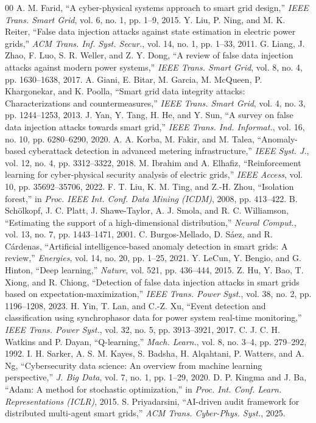 \documentclass[conference]{IEEEtran}
\begin{document}
\begin{thebibliography}{00}
 A. M. Farid, ``A cyber-physical systems approach to smart grid design,'' \textit{IEEE Trans. Smart Grid}, vol. 6, no. 1, pp. 1--9, 2015.
 Y. Liu, P. Ning, and M. K. Reiter, ``False data injection attacks against state estimation in electric power grids,'' \textit{ACM Trans. Inf. Syst. Secur.}, vol. 14, no. 1, pp. 1--33, 2011.
 G. Liang, J. Zhao, F. Luo, S. R. Weller, and Z. Y. Dong, ``A review of false data injection attacks against modern power systems,'' \textit{IEEE Trans. Smart Grid}, vol. 8, no. 4, pp. 1630--1638, 2017.
 A. Giani, E. Bitar, M. Garcia, M. McQueen, P. Khargonekar, and K. Poolla, ``Smart grid data integrity attacks: Characterizations and countermeasures,'' \textit{IEEE Trans. Smart Grid}, vol. 4, no. 3, pp. 1244--1253, 2013.
 J. Yan, Y. Tang, H. He, and Y. Sun, ``A survey on false data injection attacks towards smart grid,'' \textit{IEEE Trans. Ind. Informat.}, vol. 16, no. 10, pp. 6280--6290, 2020.
 A. A. Korba, M. Fakir, and M. Talea, ``Anomaly-based cyberattack detection in advanced metering infrastructure,'' \textit{IEEE Syst. J.}, vol. 12, no. 4, pp. 3312--3322, 2018.
 M. Ibrahim and A. Elhafiz, ``Reinforcement learning for cyber-physical security analysis of electric grids,'' \textit{IEEE Access}, vol. 10, pp. 35692--35706, 2022.
 F. T. Liu, K. M. Ting, and Z.-H. Zhou, ``Isolation forest,'' in \textit{Proc. IEEE Int. Conf. Data Mining (ICDM)}, 2008, pp. 413--422.
 B. Sch{\"o}lkopf, J. C. Platt, J. Shawe-Taylor, A. J. Smola, and R. C. Williamson, ``Estimating the support of a high-dimensional distribution,'' \textit{Neural Comput.}, vol. 13, no. 7, pp. 1443--1471, 2001.
 C. Burgos-Mellado, D. S{\'a}ez, and R. C{\'a}rdenas, ``Artificial intelligence-based anomaly detection in smart grids: A review,'' \textit{Energies}, vol. 14, no. 20, pp. 1--25, 2021.
 Y. LeCun, Y. Bengio, and G. Hinton, ``Deep learning,'' \textit{Nature}, vol. 521, pp. 436--444, 2015.
 Z. Hu, Y. Bao, T. Xiong, and R. Chiong, ``Detection of false data injection attacks in smart grids based on expectation-maximization,'' \textit{IEEE Trans. Power Syst.}, vol. 38, no. 2, pp. 1196--1208, 2023.
 H. Yin, T. Lan, and C.-Z. Xu, ``Event detection and classification using synchrophasor data for power system real-time monitoring,'' \textit{IEEE Trans. Power Syst.}, vol. 32, no. 5, pp. 3913--3921, 2017.
 C. J. C. H. Watkins and P. Dayan, ``Q-learning,'' \textit{Mach. Learn.}, vol. 8, no. 3--4, pp. 279--292, 1992.
 I. H. Sarker, A. S. M. Kayes, S. Badsha, H. Alqahtani, P. Watters, and A. Ng, ``Cybersecurity data science: An overview from machine learning perspective,'' \textit{J. Big Data}, vol. 7, no. 1, pp. 1--29, 2020.
 D. P. Kingma and J. Ba, ``Adam: A method for stochastic optimization,'' in \textit{Proc. Int. Conf. Learn. Representations (ICLR)}, 2015.
 S. Priyadarsini, ``AI-driven audit framework for distributed multi-agent smart grids,'' \textit{ACM Trans. Cyber-Phys. Syst.}, 2025.
\end{thebibliography}
\end{document}
